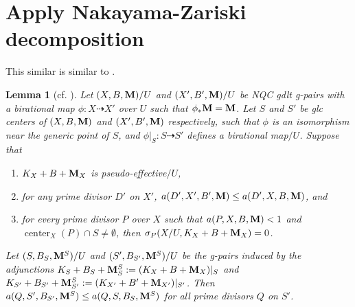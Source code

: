 \documentclass[11pt]{amsart}
\numberwithin{equation}{section}
\newcommand{\Mm}{{\bf{M}}}
\newcommand{\Rr}{\mathbb{R}}
\newcommand{\Center}{\operatorname{center}}
\newtheorem{lem}[thm]{Lemma}
\theoremstyle{definition}
\theoremstyle{definition}
\theoremstyle{definition}
\begin{document}
\begin{comment}
 & T_0 &  & & & &  & T_i & & & \\
}$
\end{center}
Let $\mu_i$ be the scaling numbers of the  $(K_{S_0'}+B_{S_0'}+\Mm^{S}_{S_0'})$-MMP$/T$ with scaling of $A_{S_0'}$ we constructed. Then $\mu_i\leq\lambda_i$ for each $i$, hence $\lim_{i\rightarrow+\infty}\mu_i=0$. By \cite[Remark 3.21, Theorem 4.1]{HL18}, this MMP terminates.
\end{proof}
\noindent\textit{Proof of Theorem \ref{thm: special termination} continued.} By Claim \ref{claim: lift sequence gmmp adjunction first}, $S_i\dashrightarrow S_{i+1}$ is the identity map for $i\gg 0$. Thus the original $(K_X+B+\Mm_X)$-MMP$/U$ with scaling of an ample$/U$ $\Rr$-divisor $A$ on $X$ terminates near $S_i$. We apply this for every $k$-dimensional glc center, and the theorem follows by induction on $k$.
\end{proof}
\end{comment}






\section{Apply Nakayama-Zariski decomposition}

This similar is similar to \cite[Section 3, before Theorem 3.14]{Has22}.


\begin{lem}[{cf. \cite[Lemma 3.5]{Has22}}]\label{lem: has22 3.5 rel} 
Let $(X,B,\Mm)/U$ and $(X',B',\Mm)/U$ be NQC gdlt g-pairs with a birational map $\phi: X\dashrightarrow X'$ over $U$ such that $\phi_*\Mm=\Mm$. Let $S$ and $S'$ be glc centers of $(X,B,\Mm)$ and $(X',B',\Mm)$ respectively, such that $\phi$ is an isomorphism near the generic point of $S$, and $\phi|_S: S\dashrightarrow S'$ defines a birational map$/U$. Suppose that
\begin{enumerate}
    \item $K_{X}+B+\Mm_X$ is pseudo-effective$/U$,
    \item for any prime divisor $D'$ on $X'$, $a(D',X',B',\Mm)\leq a(D',X,B,\Mm)$, and
    \item for every prime divisor $P$ over $X$ such that $a(P,X,B,\Mm)<1$ and $\Center_{X}(P)\cap S\not=\emptyset$, then $\sigma_{P}(X/U,K_X+B+\Mm_X)=0$.
\end{enumerate}
Let $(S,B_S,\Mm^S)/U$ and $(S',B_{S'},\Mm^S)/U$ be the g-pairs induced by the adjunctions $K_S+B_S+\Mm^S_S:=(K_X+B+\Mm_X)|_S$ and $K_{S'}+B_{S'}+\Mm^S_{S'}:=(K_{X'}+B'+\Mm_{X'})|_{S'}$. Then $a(Q,S',B_{S'},\Mm^S)\leq a(Q,S,B_S,\Mm^S)$ for all prime divisors $Q$ on $S'$. 
\end{lem} 
\end{document}
